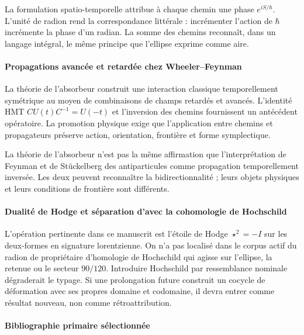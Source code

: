 La formulation spatio-temporelle attribue à chaque chemin une phase
\(e^{iS/\hbar}\). L'unité de radion rend la correspondance littérale :
incrémenter l'action de \(\hbar\) incrémente la phase d'un radian. La somme des
chemins reconnaît, dans un langage intégral, le même principe que l'ellipse
exprime comme aire.

\paragraph{Propagations avancée et retardée chez Wheeler--Feynman}

La théorie de l'absorbeur construit une interaction classique temporellement
symétrique au moyen de combinaisons de champs retardés et avancés. L'identité
HMT \(CU(t)C^{-1}=U(-t)\) et l'inversion des chemins fournissent un
antécédent opératoire. La promotion physique exige que l'application entre chemins
et propagateurs préserve action, orientation, frontière et forme symplectique.

La théorie de l'absorbeur n'est pas la même affirmation que l'interprétation de
Feynman et de Stückelberg des antiparticules comme propagation temporellement
inversée. Les deux peuvent reconnaître la bidirectionnalité ; leurs objets physiques et
leurs conditions de frontière sont différents.

\paragraph{Dualité de Hodge et séparation d'avec la cohomologie de Hochschild}

L'opération pertinente dans ce manuscrit est l'étoile de Hodge
\(\star^2=-I\) sur les deux-formes en signature lorentzienne. On n'a pas localisé dans
le corpus actif du radion de propriétaire d'homologie de Hochschild qui
agisse sur l'ellipse, la retenue ou le secteur \(90/120\). Introduire Hochschild
par ressemblance nominale dégraderait le typage. Si une prolongation future
construit un cocycle de déformation avec ses propres domaine et codomaine, il devra
entrer comme résultat nouveau, non comme rétroattribution.

\paragraph{Bibliographie primaire sélectionnée}


